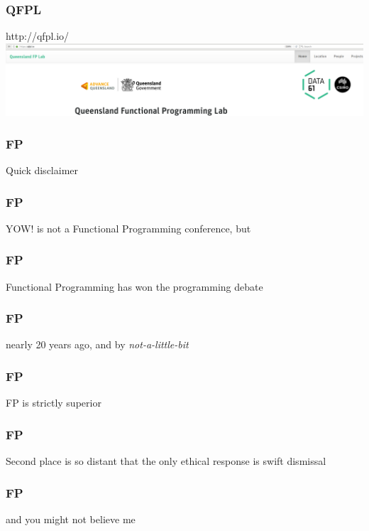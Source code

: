 \begin{frame}
\frametitle{QFPL}
\begin{block}{http://qfpl.io/}
\includegraphics[height=0.24\textheight]{image/qfpl-io.png}
\end{block}
\end{frame}

\begin{frame}
\frametitle{FP}
\begin{center}
Quick disclaimer
\end{center}
\end{frame}

\begin{frame}
\frametitle{FP}
\begin{center}
YOW! is not a Functional Programming conference, but
\end{center}
\end{frame}

\begin{frame}
\frametitle{FP}
\begin{center}
Functional Programming has won the programming debate
\end{center}
\end{frame}

\begin{frame}
\frametitle{FP}
\begin{center}
nearly 20 years ago, and by \emph{not-a-little-bit}
\end{center}
\end{frame}

\begin{frame}
\frametitle{FP}
\begin{center}
FP is strictly superior
\end{center}
\end{frame}

\begin{frame}
\frametitle{FP}
\begin{center}
Second place is so distant that the only ethical response is swift dismissal
\end{center}
\end{frame}

\begin{frame}
\frametitle{FP}
\begin{center}
and you might not believe me
\end{center}
\end{frame}


